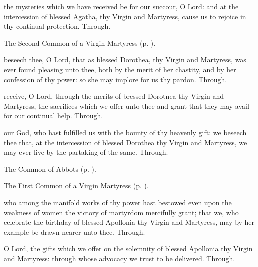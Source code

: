 \postcommunion
{} the mysteries which we have received be for our succour, O Lord: and at the intercession of blessed Agatha, thy Virgin and Martyress, cause us to rejoice in thy continual protection. Through.


\clearpage
{}

\begin{rubric}
	The Second Common of a Virgin Martyress (p. \pageref{CommonVirginMartyrII}).
\end{rubric}

\collect
{} beseech thee, O Lord, that as blessed Dorothea, thy Virgin and Martyress, was ever found pleasing unto thee, both by the merit of her chastity, and by her confession of thy power: so she may implore for us thy pardon. Through.

\secret
{} receive, O Lord, through the merits of bressed Dorotnea thy Virgin and Martyress, the sacrifices which we offer unto thee and grant that they may avail for our continual help. Through.

\postcommunion
{} our God, who hast fulfilled us with the bounty of thy heavenly gift: we beseech thee that, at the intercession of blessed Dorothea thy Virgin and Martyress, we may ever live by the partaking of the same. Through.



\begin{rubric}
	The Common of Abbots (p. \pageref{CommonAbbots}).
\end{rubric}



\begin{rubric}
	The First Common of a Virgin Martyress (p. \pageref{CommonVirginMartyrI}).
\end{rubric}

\collect
{} who among the manifold works of thy power hast bestowed even upon the weakness of women the victory of martyrdom mercifully grant; that we, who celebrate the birthday of blessed Apollonia thy Virgin and Martyress, may by her example be drawn nearer unto thee. Through.

\secret
{} O Lord, the gifts which we offer on the solemnity of blessed Apollonia thy Virgin and Martyress: through whose advocacy we trust to be delivered. Through.

